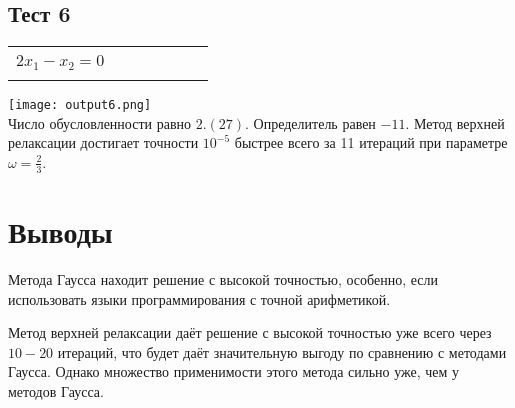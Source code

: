 \documentclass[a4paper,12pt,titlepage,finall]{article}
\begin{document}
\subsection{Тест 6}
\begin{tabular}{ccccccc}
\begin{cases}
$ 5x_1 + 3x_2 = 1 $\\
$ 2x_1 - x_2 = 0 $\\
\end{cases}
\end{tabular}

\texttt{[image: output6.png]}\\
Число обусловленности равно $2.(27)$. Определитель равен $-11$.
Метод верхней релаксации достигает точности $10^{-5}$ быстрее всего за 11 итераций при параметре $\omega = \frac{2}{3}$.
\newpage
\section{Выводы}

Метода Гаусса находит решение с высокой точностью, особенно, если использовать языки программирования с точной арифметикой.

Метод верхней релаксации даёт решение с высокой точностью уже всего через $10-20$ итераций, что будет даёт значительную выгоду по сравнению с методами Гаусса. Однако множество применимости этого метода сильно уже, чем у методов Гаусса.

\newpage
\end{document}
